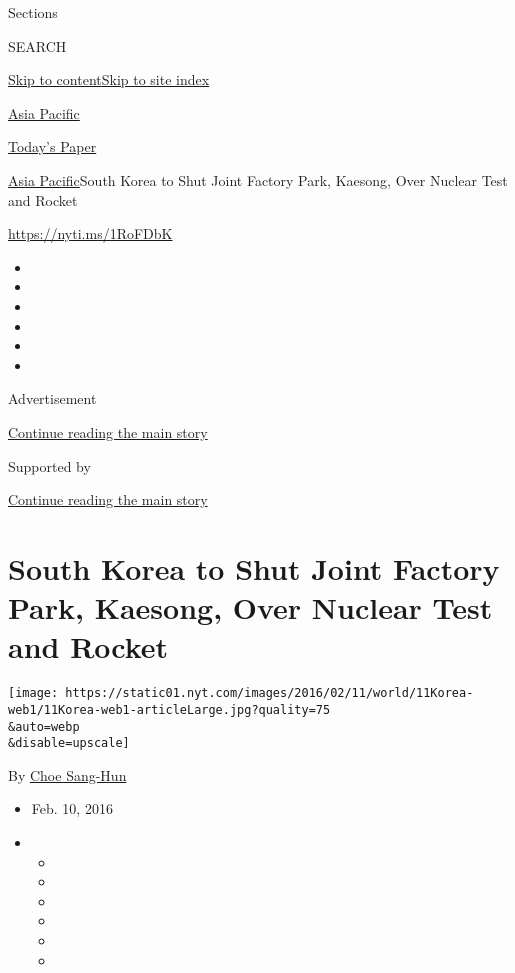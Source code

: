 Sections

SEARCH

\protect\hyperlink{site-content}{Skip to
content}\protect\hyperlink{site-index}{Skip to site index}

\href{https://www.nytimes.com/section/world/asia}{Asia Pacific}

\href{https://myaccount.nytimes.com/auth/login?response_type=cookie\&client_id=vi}{}

\href{https://www.nytimes.com/section/todayspaper}{Today's Paper}

\href{/section/world/asia}{Asia Pacific}\textbar{}South Korea to Shut
Joint Factory Park, Kaesong, Over Nuclear Test and Rocket

\url{https://nyti.ms/1RoFDbK}

\begin{itemize}
\item
\item
\item
\item
\item
\item
\end{itemize}

Advertisement

\protect\hyperlink{after-top}{Continue reading the main story}

Supported by

\protect\hyperlink{after-sponsor}{Continue reading the main story}

\hypertarget{south-korea-to-shut-joint-factory-park-kaesong-over-nuclear-test-and-rocket}{%
\section{South Korea to Shut Joint Factory Park, Kaesong, Over Nuclear
Test and
Rocket}\label{south-korea-to-shut-joint-factory-park-kaesong-over-nuclear-test-and-rocket}}

\texttt{[image: https://static01.nyt.com/images/2016/02/11/world/11Korea-web1/11Korea-web1-articleLarge.jpg?quality=75\\\&auto=webp\\\&disable=upscale]}

By \href{http://www.nytimes.com/by/choe-sang-hun}{Choe Sang-Hun}

\begin{itemize}
\item
  Feb. 10, 2016
\item
  \begin{itemize}
  \item
  \item
  \item
  \item
  \item
  \item
  \end{itemize}
\end{itemize}

